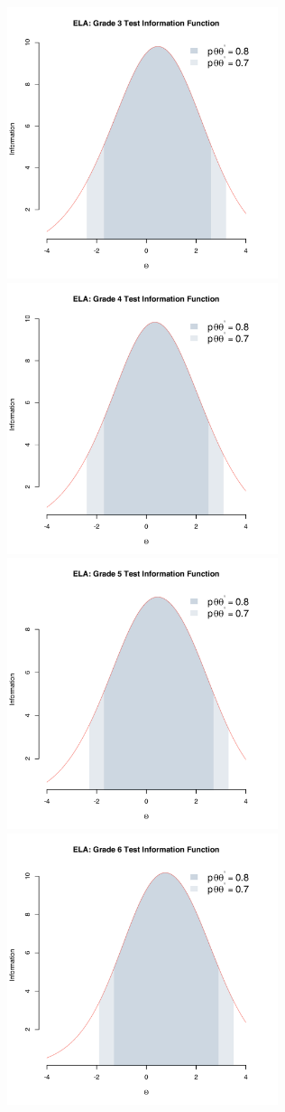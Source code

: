 \documentclass[]{article}
\begin{document}
\FloatBarrier
\includegraphics[height=3.12500in]{tifs/ela3tif.pdf}
\includegraphics[height=3.12500in]{tifs/ela4tif.pdf}
\includegraphics[height=3.12500in]{tifs/ela5tif.pdf}
\includegraphics[height=3.12500in]{tifs/ela6tif.pdf}
\end{document}
